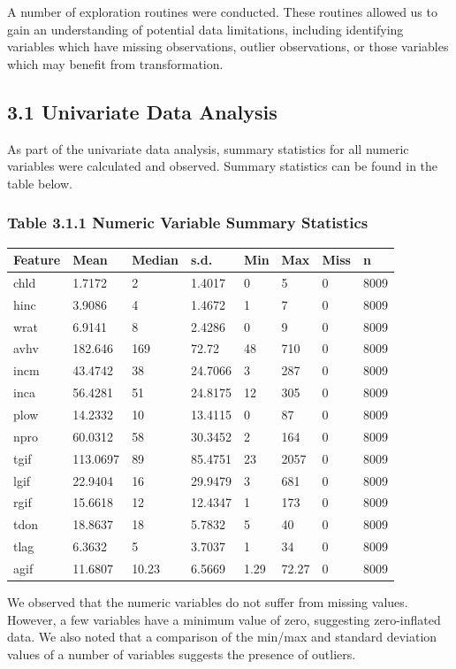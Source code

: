 \documentclass[]{article}
\begin{document}
A number of exploration routines were conducted. These routines allowed
us to gain an understanding of potential data limitations, including
identifying variables which have missing observations, outlier
observations, or those variables which may benefit from transformation.

\subsection{3.1 Univariate Data
Analysis}\label{univariate-data-analysis}

As part of the univariate data analysis, summary statistics for all
numeric variables were calculated and observed. Summary statistics can
be found in the table below.

\subsubsection{Table 3.1.1 Numeric Variable Summary
Statistics}\label{table-3.1.1-numeric-variable-summary-statistics}

\begin{longtable}[]{@{}llllllll@{}}
\toprule
Feature & Mean & Median & s.d. & Min & Max & Miss & n\tabularnewline
\midrule
\endhead
chld & 1.7172 & 2 & 1.4017 & 0 & 5 & 0 & 8009\tabularnewline
hinc & 3.9086 & 4 & 1.4672 & 1 & 7 & 0 & 8009\tabularnewline
wrat & 6.9141 & 8 & 2.4286 & 0 & 9 & 0 & 8009\tabularnewline
avhv & 182.646 & 169 & 72.72 & 48 & 710 & 0 & 8009\tabularnewline
incm & 43.4742 & 38 & 24.7066 & 3 & 287 & 0 & 8009\tabularnewline
inca & 56.4281 & 51 & 24.8175 & 12 & 305 & 0 & 8009\tabularnewline
plow & 14.2332 & 10 & 13.4115 & 0 & 87 & 0 & 8009\tabularnewline
npro & 60.0312 & 58 & 30.3452 & 2 & 164 & 0 & 8009\tabularnewline
tgif & 113.0697 & 89 & 85.4751 & 23 & 2057 & 0 & 8009\tabularnewline
lgif & 22.9404 & 16 & 29.9479 & 3 & 681 & 0 & 8009\tabularnewline
rgif & 15.6618 & 12 & 12.4347 & 1 & 173 & 0 & 8009\tabularnewline
tdon & 18.8637 & 18 & 5.7832 & 5 & 40 & 0 & 8009\tabularnewline
tlag & 6.3632 & 5 & 3.7037 & 1 & 34 & 0 & 8009\tabularnewline
agif & 11.6807 & 10.23 & 6.5669 & 1.29 & 72.27 & 0 & 8009\tabularnewline
\bottomrule
\end{longtable}

We observed that the numeric variables do not suffer from missing
values. However, a few variables have a minimum value of zero,
suggesting zero-inflated data. We also noted that a comparison of the
min/max and standard deviation values of a number of variables suggests
the presence of outliers.
\end{document}
